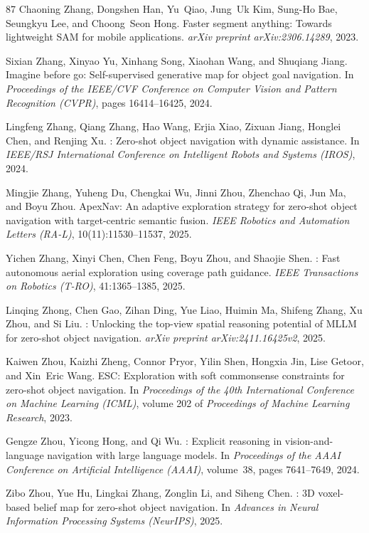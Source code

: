 \documentclass[10pt]{article}
\begin{document}
\begin{thebibliography}{87}
Chaoning Zhang, Dongshen Han, Yu~Qiao, Jung~Uk Kim, Sung-Ho Bae, Seungkyu Lee, and Choong~Seon Hong.
\newblock Faster segment anything: Towards lightweight {SAM} for mobile applications.
\newblock \emph{arXiv preprint arXiv:2306.14289}, 2023.

Sixian Zhang, Xinyao Yu, Xinhang Song, Xiaohan Wang, and Shuqiang Jiang.
\newblock Imagine before go: Self-supervised generative map for object goal navigation.
\newblock In \emph{Proceedings of the IEEE/CVF Conference on Computer Vision and Pattern Recognition (CVPR)}, pages 16414--16425, 2024.

Lingfeng Zhang, Qiang Zhang, Hao Wang, Erjia Xiao, Zixuan Jiang, Honglei Chen, and Renjing Xu.
: Zero-shot object navigation with dynamic assistance.
\newblock In \emph{IEEE/RSJ International Conference on Intelligent Robots and Systems (IROS)}, 2024.

Mingjie Zhang, Yuheng Du, Chengkai Wu, Jinni Zhou, Zhenchao Qi, Jun Ma, and Boyu Zhou.
\newblock ApexNav: An adaptive exploration strategy for zero-shot object navigation with target-centric semantic fusion.
\newblock \emph{IEEE Robotics and Automation Letters (RA-L)}, 10(11):11530--11537, 2025.

Yichen Zhang, Xinyi Chen, Chen Feng, Boyu Zhou, and Shaojie Shen.
: Fast autonomous aerial exploration using coverage path guidance.
\newblock \emph{IEEE Transactions on Robotics (T-RO)}, 41:1365--1385, 2025.

Linqing Zhong, Chen Gao, Zihan Ding, Yue Liao, Huimin Ma, Shifeng Zhang, Xu Zhou, and Si Liu.
: Unlocking the top-view spatial reasoning potential of {MLLM} for zero-shot object navigation.
\newblock \emph{arXiv preprint arXiv:2411.16425v2}, 2025.

Kaiwen Zhou, Kaizhi Zheng, Connor Pryor, Yilin Shen, Hongxia Jin, Lise Getoor, and Xin~Eric Wang.
\newblock ESC: Exploration with soft commonsense constraints for zero-shot object navigation.
\newblock In \emph{Proceedings of the 40th International Conference on Machine Learning (ICML)}, volume 202 of \emph{Proceedings of Machine Learning Research}, 2023.

Gengze Zhou, Yicong Hong, and Qi Wu.
: Explicit reasoning in vision-and-language navigation with large language models.
\newblock In \emph{Proceedings of the AAAI Conference on Artificial Intelligence (AAAI)}, volume~38, pages 7641--7649, 2024.

Zibo Zhou, Yue Hu, Lingkai Zhang, Zonglin Li, and Siheng Chen.
: {3D} voxel-based belief map for zero-shot object navigation.
\newblock In \emph{Advances in Neural Information Processing Systems (NeurIPS)}, 2025.

\end{thebibliography}
\end{document}
